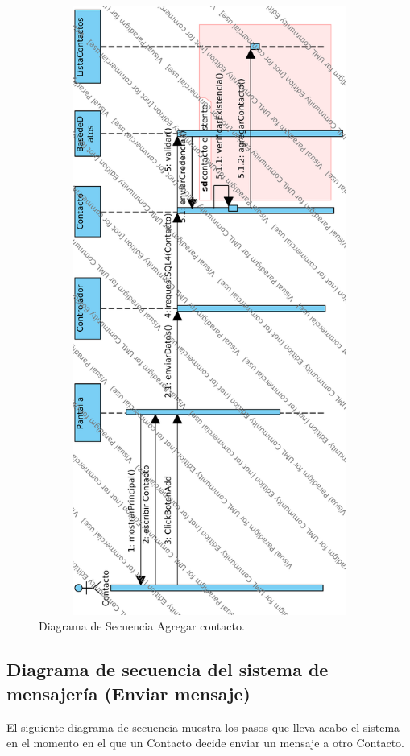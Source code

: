 	
	\begin{figure}[htbp!]
		\centering
			\includegraphics[width=15cm, height=20cm]{images/Diagramas/SecAdd}
		\caption{Diagrama de Secuencia Agregar contacto.}
	\end{figure}
		\pagebreak
\subsection{Diagrama de secuencia del sistema de mensajer\'ia (Enviar mensaje)}
El siguiente diagrama de secuencia muestra los pasos que lleva acabo el sistema en el momento en el que un Contacto decide enviar un mensaje a otro Contacto.
		
